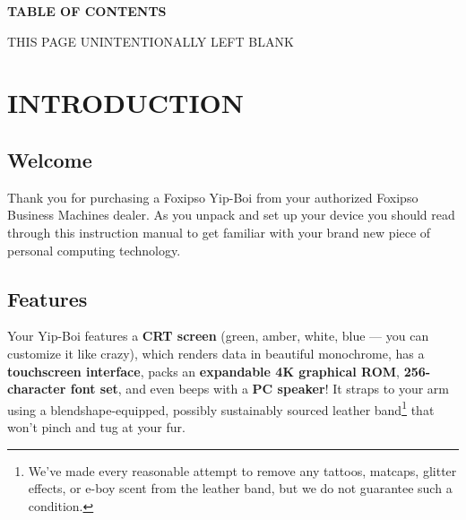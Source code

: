 \documentclass[10pt]{article}
\begin{document}
\newpage
\thispagestyle{fancy}

\begin{center}
{\Large\bfseries\ttfamily\color{mantitle} TABLE OF CONTENTS}
\end{center}
\vspace{0.5em}

\renewcommand{\contentsname}{}
\setcounter{tocdepth}{2}
{\small
\makeatletter
{}
\makeatother
}

\newpage
\thispagestyle{fancy}
\vspace*{\fill}
\begin{center}
{\small\ttfamily THIS PAGE UNINTENTIONALLY LEFT BLANK}
\end{center}
\vspace*{\fill}

\newpage
\section{INTRODUCTION}
\label{sec:intro}

\subsection{Welcome}

Thank you for purchasing a Foxipso Yip-Boi from your authorized Foxipso Business Machines dealer. As you unpack and set up your device you should read through this instruction manual to get familiar with your brand new piece of personal computing technology.

\subsection{Features}

Your Yip-Boi features a \textbf{CRT screen} (green, amber, white, blue --- you can customize it like crazy), which renders data in beautiful monochrome, has a \textbf{touchscreen interface}, packs an \textbf{expandable 4K graphical ROM}, \textbf{256-character font set}, and even beeps with a \textbf{PC speaker}! It straps to your arm using a blendshape-equipped, possibly sustainably sourced leather band\footnote{We've made every reasonable attempt to remove any tattoos, matcaps, glitter effects, or e-boy scent from the leather band, but we do not guarantee such a condition.} that won't pinch and tug at your fur.
\end{document}
